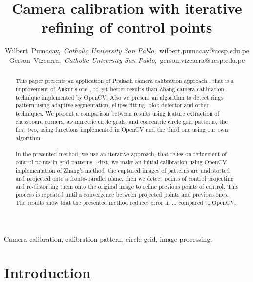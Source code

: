 \documentclass[journal]{IEEEtran}
\begin{document}
\title{Camera calibration with iterative refining of control points}

\author{Wilbert~Pumacay,~\textit{Catholic University San Pablo},~wilbert.pumacay@ucsp.edu.pe\\
        Gerson~Vizcarra,~\textit{Catholic University San Pablo},~gerson.vizcarra@ucsp.edu.pe}

\maketitle

\begin{abstract}
This paper presents an application of Prakash camera calibration approach \cite{Prakash2012}, that is a improvement of Ankur's one \cite{Ankur2009}, to get better results than Zhang \cite{CameraCalibration1} camera calibration technique implemented by OpenCV. Also we present an algorithm to detect rings pattern using adaptive segmentation, ellipse fitting, blob detector and other techniques. We present a comparison between results using feature extraction of chessboard corners, asymmetric circle grids, and concentric circle grid patterns, the first two, using functions implemented in OpenCV and the third one using our own algorithm.
\\
\\
In the presented method, we use an iterative approach, that relies on refinement of control points in grid patterns. First, we make an initial calibration using OpenCV implementation of Zhang's method, the captured images of patterns are undistorted and projected onto a fronto-parallel plane, then we detect points of control projecting and re-distorting them onto the original image to refine previous points of control. This process is repeated until a convergence between projected points and previous ones. The results show that the presented method reduces error in ... compared to OpenCV.

\end{abstract}

\begin{IEEEkeywords}
Camera calibration, calibration pattern, circle grid, image processing.
\end{IEEEkeywords}


\section{Introduction}
\end{document}
